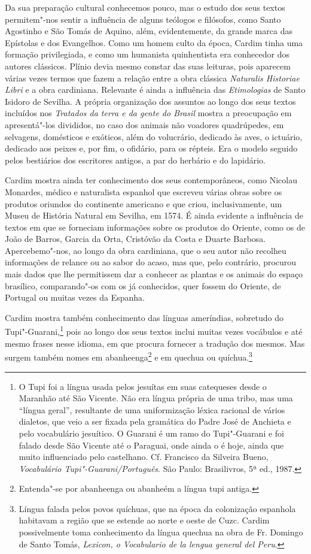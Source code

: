  Da sua preparação cultural conhecemos pouco, mas o estudo dos seus
textos permitem"-nos sentir a influência de alguns teólogos e filósofos,
como Santo Agostinho e São Tomás de Aquino, além, evidentemente, da
grande marca das Epístolas e dos Evangelhos. Como um homem culto da
época, Cardim tinha uma formação privilegiada, e como um humanista
quinhentista era conhecedor dos autores clássicos. Plínio devia mesmo
constar das suas leituras, pois aparecem várias vezes termos que fazem
a relação entre a obra clássica \textit{Naturalis Historiae Libri} e
a obra cardiniana. Relevante é ainda a influência das
\textit{Etimologias} de Santo Isidoro de Sevilha. A própria organização
dos assuntos ao longo dos seus textos incluídos nos \textit{Tratados da
terra e da gente do Brasil} mostra a preocupação em apresentá"-los
divididos, no caso dos animais não voadores quadrúpedes, em selvagens,
domésticos e exóticos, além do volucrário, dedicado às aves, o
ictuário, dedicado aos peixes e, por fim, o ofidário, para os répteis.
Era o modelo seguido pelos bestiários dos escritores antigos, a par do
herbário e do lapidário. 

 Cardim mostra ainda ter conhecimento dos seus
contemporâneos, como Nicolau Monardes, médico e naturalista espanhol
que escreveu várias obras sobre os produtos oriundos do continente
americano e que criou, inclusivamente, um Museu de História Natural em
Sevilha, em 1574. É ainda evidente a influência de textos em que se
forneciam informações sobre os produtos do Oriente, como os de João de
Barros, Garcia da Orta, Cristóvão da Costa e Duarte Barbosa.
Apercebemo"-nos, ao longo da obra cardiniana, que o seu autor não
recolheu informações de relance ou ao sabor do acaso, mas que, pelo
contrário, procurou mais dados que lhe permitissem dar a conhecer as
plantas e os animais do espaço brasílico, comparando"-os com os já
conhecidos, quer fossem do Oriente, de Portugal ou muitas vezes da Espanha. 

Cardim mostra também conhecimento das línguas ameríndias, sobretudo
do Tupi"-Guarani,\footnote{ O Tupi foi a língua usada pelos
jesuítas em suas catequeses desde o Maranhão até São Vicente. Não era
língua própria de uma tribo, mas uma ``língua geral'', resultante de uma
uniformização léxica racional de vários dialetos, que veio a ser
fixada pela gramática do Padre José de Anchieta e pelo vocabulário
jesuítico. O Guarani é um ramo do Tupi"-Guarani e foi falado
desde São Vicente até o Paraguai, onde ainda o é hoje, ainda que muito
influenciado pelo castelhano. Cf. Francisco da Silveira Bueno,
\textit{Vocabulário Tupi"-Guarani/Português}. São Paulo: Brasilivros, 
5ª ed., 1987.} pois ao longo dos seus textos inclui muitas 
vezes vocábulos e até mesmo frases nesse idioma, em que procura
fornecer a tradução dos mesmos. Mas surgem também nomes em
abanheenga\footnote{ Entenda"-se por abanheenga ou
abanheém a língua tupi antiga.} e em quechua ou 
quíchua.\footnote{Língua falada pelos povos quíchuas, que na época 
da colonização espanhola habitavam a região que se estende ao
norte e oeste de Cuzc. Cardim possivelmente toma conhecimento da língua quechua na obra de Fr. Domingo de Santo
Tomás, \textit{Lexicon, o Vocabulario de la lengua general del Peru}.}


